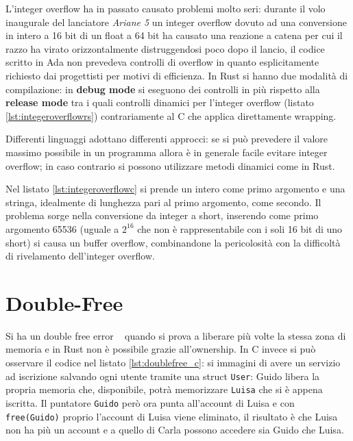 \documentclass[Lau,binding=0.6cm]{sapthesis}
\newcommand{\textcode}[1]{\colorbox{backcolour}{\texttt{#1}}}
\begin{document}
L'integer overflow ha in passato causato problemi molto seri: durante il volo inaugurale del lanciatore \textit{Ariane 5} un integer overflow dovuto ad una conversione in intero a 16 bit di un float a 64 bit ha causato una reazione a catena per cui il razzo ha virato orizzontalmente distruggendosi poco dopo il lancio, il codice scritto in Ada non prevedeva controlli di overflow in quanto esplicitamente richiesto dai progettisti per motivi di efficienza. 
In Rust si hanno due modalità di compilazione: in \textbf{debug mode} si eseguono dei controlli in più rispetto alla \textbf{release mode} tra i quali controlli dinamici per l'integer overflow (listato \ref{lst:integeroverflowrs}) contrariamente al C che applica direttamente wrapping.

Differenti linguaggi adottano differenti approcci: se si può prevedere il valore massimo possibile in un programma allora è in generale facile evitare integer overflow; in caso contrario si possono utilizzare metodi dinamici come in Rust. 




Nel listato \ref{lst:integeroverflowc} si prende un intero come primo argomento e una stringa, idealmente di lunghezza pari al primo argomento, come secondo.
Il problema sorge nella conversione da integer a short, inserendo come primo argomento 65536 (uguale a $ 2^{16} $ che non è rappresentabile con i soli 16 bit di uno short) si causa un buffer overflow, combinandone la pericolosità con la difficoltà di rivelamento dell'integer overflow.




\section{Double-Free} \label{sec:double_free}
Si ha un double free error ~\cite[10.4.4]{gollmann:computersecurity} quando si prova a liberare più volte la stessa zona di memoria e in Rust non è possibile grazie all'ownership.
In C invece si può osservare il codice nel listato \ref{lst:doublefree_c}: si immagini di avere un servizio ad iscrizione salvando ogni utente tramite una struct \textcode{User}: Guido libera la propria memoria che, disponibile, potrà memorizzare \textcode{Luisa} che si è appena iscritta. Il puntatore \textcode{Guido} però ora punta all'account di Luisa e con \textcode{free(Guido)} proprio l'account di Luisa viene eliminato, il risultato è che Luisa non ha più un account e a quello di Carla possono accedere sia Guido che Luisa.
\end{document}
